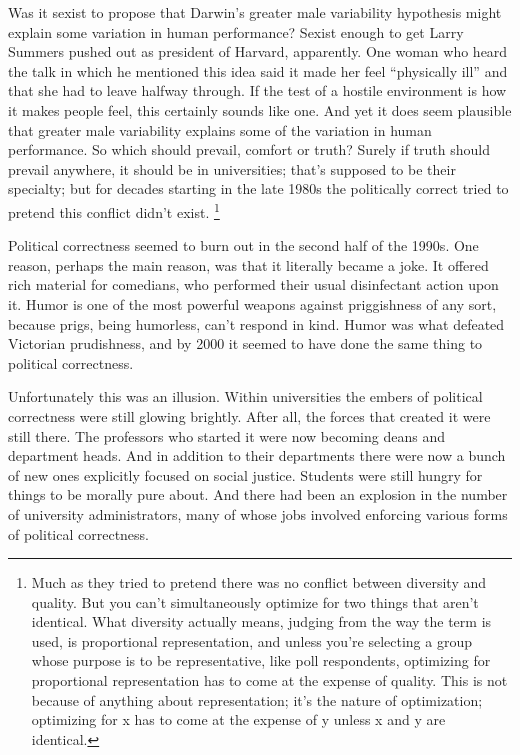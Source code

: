 \documentclass[12pt]{book}
\begin{document}
Was it sexist to propose that Darwin's greater male variability
hypothesis might explain some variation in human performance? Sexist
enough to get Larry Summers pushed out as president of Harvard,
apparently. One woman who heard the talk in which he mentioned this idea
said it made her feel ``physically ill'' and that she had to leave
halfway through. If the test of a hostile environment is how it makes
people feel, this certainly sounds like one. And yet it does seem
plausible that greater male variability explains some of the variation
in human performance. So which should prevail, comfort or truth? Surely
if truth should prevail anywhere, it should be in universities; that's
supposed to be their specialty; but for decades starting in the late
1980s the politically correct tried to pretend this conflict didn't
exist. \footnote{Much as they tried to pretend there was no conflict between
diversity and quality. But you can't simultaneously optimize for two
things that aren't identical. What diversity actually means, judging
from the way the term is used, is proportional representation, and
unless you're selecting a group whose purpose is to be representative,
like poll respondents, optimizing for proportional representation has to
come at the expense of quality. This is not because of anything about
representation; it's the nature of optimization; optimizing for x has to
come at the expense of y unless x and y are identical.}

Political correctness seemed to burn out in the second half of the
1990s. One reason, perhaps the main reason, was that it literally became
a joke. It offered rich material for comedians, who performed their
usual disinfectant action upon it. Humor is one of the most powerful
weapons against priggishness of any sort, because prigs, being
humorless, can't respond in kind. Humor was what defeated Victorian
prudishness, and by 2000 it seemed to have done the same thing to
political correctness.

Unfortunately this was an illusion. Within universities the embers of
political correctness were still glowing brightly. After all, the forces
that created it were still there. The professors who started it were now
becoming deans and department heads. And in addition to their
departments there were now a bunch of new ones explicitly focused on
social justice. Students were still hungry for things to be morally pure
about. And there had been an explosion in the number of university
administrators, many of whose jobs involved enforcing various forms of
political correctness.
\end{document}
